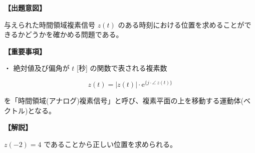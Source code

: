 \noindent \textbf{【出題意図】}

\bigskip
\noindent 与えられた時間領域複素信号 $z(t)$ のある時刻における位置を求めることができるかどうかを確かめる問題である。

\vspace{1em}
\noindent \textbf{【重要事項】}

\bigskip
\noindent ・ 絶対値及び偏角が $t$ [秒] の関数で表される複素数

\[
z(t) = |z(t)| \cdot \textrm{e}^{\{j \cdot \angle \ z(t)\}}
\]

\medskip
\noindent を「時間領域(アナログ)複素信号」と呼び、複素平面の上を移動する運動体(ベクトル)となる。

\vspace{1em}
\noindent \textbf{【解説】}

\bigskip
\noindent $z(-2) = 4$ であることから正しい位置を求められる。
